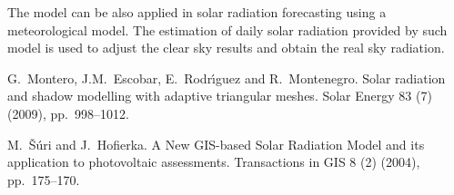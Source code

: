 The model can be also applied in solar radiation forecasting using a meteorological model. The estimation of daily solar radiation provided by such model is used to adjust the clear sky results and obtain the real sky radiation.


\begin{thebibliography}{10}
{\sc G.~Montero, J.M.~Escobar, E.~Rodr\'{\i}guez and R.~Montenegro}. {Solar radiation and shadow modelling with adaptive triangular meshes}. Solar Energy 83 (7) (2009), pp.~998--1012.

{\sc M.~\v{S}\'uri and J.~Hofierka}. {A New GIS-based Solar Radiation Model and its application to photovoltaic assessments}. Transactions in GIS 8 (2) (2004), pp.~175--170.
\end{thebibliography}